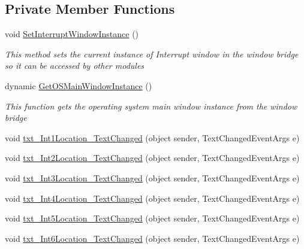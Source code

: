 \subsection*{Private Member Functions}
\begin{DoxyCompactItemize}
\item 
void \hyperlink{class_c_p_u___o_s___simulator_1_1_interrupts_window_aa24185f7583e21c56949e194dc47481c}{Set\+Interrupt\+Window\+Instance} ()
\begin{DoxyCompactList}\small\item\em This method sets the current instance of Interrupt window in the window bridge so it can be accessed by other modules \end{DoxyCompactList}\item 
dynamic \hyperlink{class_c_p_u___o_s___simulator_1_1_interrupts_window_ad5793a78da60959e7f9b96fe96d67391}{Get\+O\+S\+Main\+Window\+Instance} ()
\begin{DoxyCompactList}\small\item\em This function gets the operating system main window instance from the window bridge \end{DoxyCompactList}\item 
void \hyperlink{class_c_p_u___o_s___simulator_1_1_interrupts_window_a047fe6f11b51716f5a610e67756b81e5}{txt\+\_\+\+Int1\+Location\+\_\+\+Text\+Changed} (object sender, Text\+Changed\+Event\+Args e)
\item 
void \hyperlink{class_c_p_u___o_s___simulator_1_1_interrupts_window_aaa7f93260d77e53177c8aa3bbe55c7e3}{txt\+\_\+\+Int2\+Location\+\_\+\+Text\+Changed} (object sender, Text\+Changed\+Event\+Args e)
\item 
void \hyperlink{class_c_p_u___o_s___simulator_1_1_interrupts_window_a20246b868a439b8f1971ab02855f66a4}{txt\+\_\+\+Int3\+Location\+\_\+\+Text\+Changed} (object sender, Text\+Changed\+Event\+Args e)
\item 
void \hyperlink{class_c_p_u___o_s___simulator_1_1_interrupts_window_a6bc6b19ffe944c2699a3ce6e5818ed85}{txt\+\_\+\+Int4\+Location\+\_\+\+Text\+Changed} (object sender, Text\+Changed\+Event\+Args e)
\item 
void \hyperlink{class_c_p_u___o_s___simulator_1_1_interrupts_window_ad72ab4f946f2fb0ec0934826e406115c}{txt\+\_\+\+Int5\+Location\+\_\+\+Text\+Changed} (object sender, Text\+Changed\+Event\+Args e)
\item 
void \hyperlink{class_c_p_u___o_s___simulator_1_1_interrupts_window_aff9329df340a45703f62c656813ec53b}{txt\+\_\+\+Int6\+Location\+\_\+\+Text\+Changed} (object sender, Text\+Changed\+Event\+Args e)

\end{DoxyCompactItemize}
